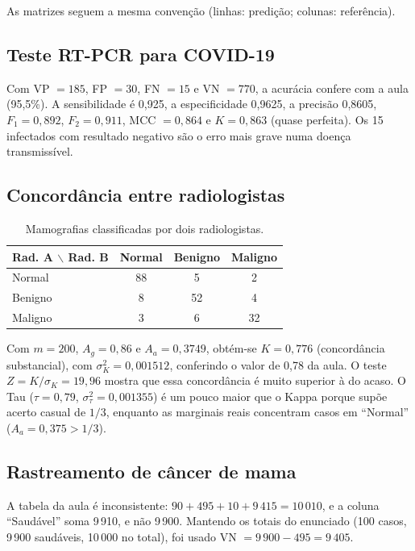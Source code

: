 \documentclass[12pt,a4paper]{article}
\begin{document}
As matrizes seguem a mesma convenção (linhas: predição; colunas: referência).

\subsection{Teste RT-PCR para COVID-19}

Com VP $= 185$, FP $= 30$, FN $= 15$ e VN $= 770$, a acurácia confere com a aula (95,5\%). A sensibilidade é 0,925, a especificidade 0,9625, a precisão 0,8605, $F_1 = 0{,}892$, $F_2 = 0{,}911$, MCC $= 0{,}864$ e $K = 0{,}863$ (quase perfeita). Os 15 infectados com resultado negativo são o erro mais grave numa doença transmissível.

\subsection{Concordância entre radiologistas}

\begin{table}[H]
\centering
\caption{Mamografias classificadas por dois radiologistas.}
\label{tab:radiologistas}
\begin{tabular}{lccc}
\toprule
Rad. A $\backslash$ Rad. B & Normal & Benigno & Maligno \\
\midrule
Normal  & 88 & 5  & 2  \\
Benigno & 8  & 52 & 4  \\
Maligno & 3  & 6  & 32 \\
\bottomrule
\end{tabular}
\end{table}

Com $m = 200$, $A_g = 0{,}86$ e $A_a = 0{,}3749$, obtém-se $K = 0{,}776$ (concordância substancial), com $\sigma_K^2 = 0{,}001512$, conferindo o valor de 0,78 da aula. O teste $Z = K/\sigma_K = 19{,}96$ mostra que essa concordância é muito superior à do acaso. O Tau ($\tau = 0{,}79$, $\sigma_\tau^2 = 0{,}001355$) é um pouco maior que o Kappa porque supõe acerto casual de $1/3$, enquanto as marginais reais concentram casos em ``Normal'' ($A_a = 0{,}375 > 1/3$).

\subsection{Rastreamento de câncer de mama}

A tabela da aula é inconsistente: $90 + 495 + 10 + 9\,415 = 10\,010$, e a coluna ``Saudável'' soma 9\,910, e não 9\,900. Mantendo os totais do enunciado (100 casos, 9\,900 saudáveis, 10\,000 no total), foi usado VN $= 9\,900 - 495 = 9\,405$.
\end{document}
